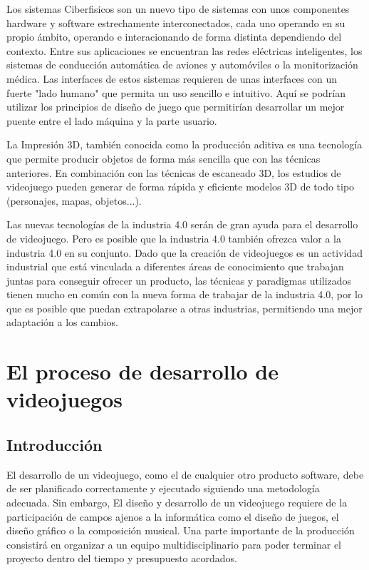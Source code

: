 Los sistemas Ciberfisicos son  un nuevo tipo de sistemas con unos componentes hardware y software estrechamente interconectados, cada uno operando en su propio ámbito, operando e interacionando de forma distinta dependiendo del contexto. Entre sus aplicaciones se encuentran las redes eléctricas inteligentes, los sistemas de conducción automática de aviones y automóviles o la monitorización médica. Las interfaces de estos sistemas requieren de unas interfaces con un fuerte "lado humano" que permita un uso sencillo e intuitivo. Aquí se podrían utilizar los principios de diseño de juego que permitirían desarrollar un mejor puente entre el lado máquina y la parte usuario.

La Impresión 3D, también conocida como la producción aditiva es una tecnología que permite producir objetos de forma más sencilla que con las técnicas anteriores. En combinación con las técnicas de escaneado 3D, los estudios de videojuego pueden generar de forma rápida y eficiente modelos 3D de todo tipo (personajes, mapas, objetos...).

Las nuevas tecnologías de la industria 4.0 serán de gran ayuda para el desarrollo de videojuego. Pero es posible que la industria 4.0 también ofrezca valor a la industria 4.0 en su conjunto. Dado que la creación de videojuegos es un actividad industrial que está vinculada a diferentes áreas de conocimiento que trabajan juntas para conseguir ofrecer un producto, las técnicas y paradigmas utilizados tienen mucho en común con la nueva forma de trabajar de la industria 4.0, por lo que es posible que puedan extrapolarse a otras industrias, permitiendo una mejor adaptación a los cambios.

\section{El proceso de desarrollo de videojuegos}
\subsection{Introducción}
El desarrollo de un videojuego, como el de cualquier otro producto software, debe de ser planificado correctamente y ejecutado siguiendo una metodología adecuada. Sin embargo, El diseño y desarrollo de un videojuego requiere de la participación de campos ajenos a la informática como el diseño de juegos, el diseño gráfico o la composición musical. Una parte importante de  la producción consistirá en organizar a un equipo multidisciplinario para poder terminar el proyecto dentro del tiempo y presupuesto acordados.

